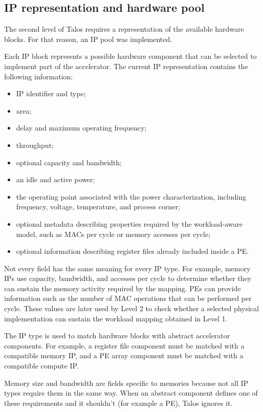 \subsection{IP representation and hardware pool}
\label{subsec:ip_pool}
The second level of Talos requires a representation of the available
hardware blocks. For that reason, an IP pool was implemented.

Each IP block represents a possible hardware component that can be
selected to implement part of the accelerator. The current IP
representation contains the following information:

\begin{itemize}
\item IP identifier and type;
\item area;
\item delay and maximum operating frequency;
\item throughput;
\item optional capacity and bandwidth;
\item an idle and active power;
\item the operating point associated with the power characterization,
including frequency, voltage, temperature, and process corner;
\item optional metadata describing properties required by the
workload-aware model, such as MACs per cycle or memory accesses per
cycle;
\item optional information describing register files already included
inside a PE.
\end{itemize}

Not every field has the same meaning for every IP type. For example,
memory IPs use capacity, bandwidth, and accesses per cycle to determine
whether they can sustain the memory activity required by the mapping.
PEs can provide information such as the number of MAC operations that
can be performed per cycle. These values are later used by Level 2 to
check whether a selected physical implementation can sustain the
workload mapping obtained in Level 1.

The IP type is used to match hardware blocks with abstract
accelerator components. For example, a register file component must
be matched with a compatible memory IP, and a PE array component must
be matched with a compatible compute IP.

Memory size and bandwidth are fields specific to memories
because not all IP types
require them in the same way. When an abstract component defines one
of these requirements and it shouldn't (for example a PE), 
Talos ignores it.


